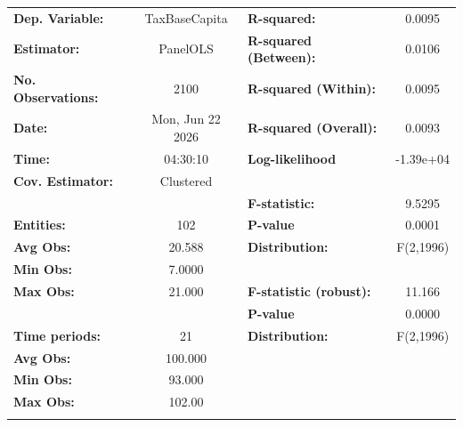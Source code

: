\begin{center}
\begin{tabular}{lclc}
\toprule
\textbf{Dep. Variable:}          &   TaxBaseCapita    & \textbf{  R-squared:         }   &      0.0095      \\
\textbf{Estimator:}              &      PanelOLS      & \textbf{  R-squared (Between):}  &      0.0106      \\
\textbf{No. Observations:}       &        2100        & \textbf{  R-squared (Within):}   &      0.0095      \\
\textbf{Date:}                   &  Mon, Jun 22 2026  & \textbf{  R-squared (Overall):}  &      0.0093      \\
\textbf{Time:}                   &      04:30:10      & \textbf{  Log-likelihood     }   &    -1.39e+04     \\
\textbf{Cov. Estimator:}         &     Clustered      & \textbf{                     }   &                  \\
\textbf{}                        &                    & \textbf{  F-statistic:       }   &      9.5295      \\
\textbf{Entities:}               &        102         & \textbf{  P-value            }   &      0.0001      \\
\textbf{Avg Obs:}                &       20.588       & \textbf{  Distribution:      }   &    F(2,1996)     \\
\textbf{Min Obs:}                &       7.0000       & \textbf{                     }   &                  \\
\textbf{Max Obs:}                &       21.000       & \textbf{  F-statistic (robust):} &      11.166      \\
\textbf{}                        &                    & \textbf{  P-value            }   &      0.0000      \\
\textbf{Time periods:}           &         21         & \textbf{  Distribution:      }   &    F(2,1996)     \\
\textbf{Avg Obs:}                &      100.000       & \textbf{                     }   &                  \\
\textbf{Min Obs:}                &       93.000       & \textbf{                     }   &                  \\
\textbf{Max Obs:}                &       102.00       & \textbf{                     }   &                  \\
\textbf{}                        &                    & \textbf{                     }   &                  \\

\end{tabular}
\end{center}
